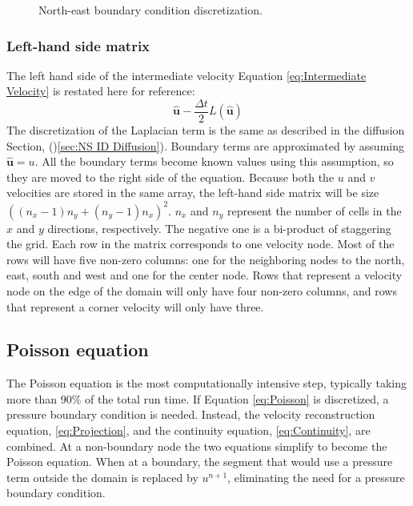 \begin{figure}[!htb]
	\centering
	
	\caption{North-east boundary condition discretization.}
	\label{fig:ID iv bc}
\end{figure}

\subsubsection{Left-hand side matrix}
\label{sec:ID NS lhs}
The left hand side of the intermediate velocity Equation \eqref{eq:Intermediate Velocity} is restated here for reference:
\begin{equation}
\hat{\textbf{u}} - \frac{\Delta t}{2}L(\hat{\textbf{u}})
\end{equation}
The discretization of the Laplacian term is the same as described in the diffusion Section, ()\ref{sec:NS ID Diffusion}). 
Boundary terms are approximated by assuming $\hat{\textbf{u}}=u$. 
All the boundary terms become known values using this assumption, so they are moved to the right side of the equation. 
Because both the $u$ and $v$ velocities are stored in the same array, the left-hand side matrix will be size $\left((n_x-1)n_y + (n_y-1)n_x\right)^2$. 
$n_x$ and $n_y$ represent the number of cells in the $x$ and $y$ directions, respectively.
The negative one is a bi-product of staggering the grid. 
Each row in the matrix corresponds to one velocity node. 
Most of the rows will have five non-zero columns: one for the neighboring nodes to the north, east, south and west and one for the center node. 
Rows that represent a velocity node on the edge of the domain will only have four non-zero columns, and rows that represent a corner velocity will only have three. 

\subsection{Poisson equation}
\label{sec:ID NS poisson}
The Poisson equation is the most computationally intensive step, typically taking more than 90\% of the total run time.
If Equation \eqref{eq:Poisson} is discretized, a pressure boundary condition is needed.
Instead, the velocity reconstruction equation, \eqref{eq:Projection}, and the continuity equation, \eqref{eq:Continuity}, are combined.
At a non-boundary node the two equations simplify to become the Poisson equation.
When at a boundary, the segment that would use a pressure term outside the domain is replaced by $u^{n+1}$, eliminating the need for a pressure boundary condition.

